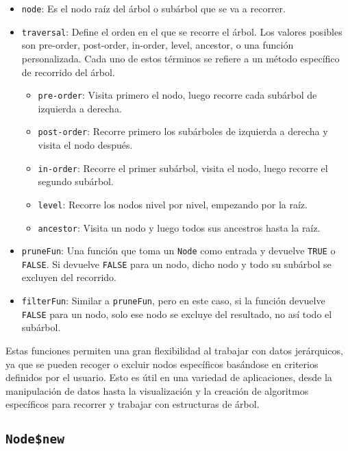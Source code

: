 \documentclass[12pt]{report}\usepackage[]{graphicx}\usepackage[dvipsnames]{xcolor}
\begin{document}
			 	\begin{itemize}
			 		\item \texttt{node}: Es el nodo raíz del árbol o subárbol que se va a recorrer.
			 		\item \texttt{traversal}: Define el orden en el que se recorre el árbol. Los valores posibles son pre-order, post-order, in-order, level, ancestor, o una función personalizada. Cada uno de estos términos se refiere a un método específico de recorrido del árbol.
			 		
			 		\begin{itemize}
			 			\item \texttt{pre-order}: Visita primero el nodo, luego recorre cada subárbol de izquierda a derecha.
			 			\item \texttt{post-order}: Recorre primero los subárboles de izquierda a derecha y visita el nodo después.
			 			\item \texttt{in-order}: Recorre el primer subárbol, visita el nodo, luego recorre el segundo subárbol.
			 			\item \texttt{level}: Recorre los nodos nivel por nivel, empezando por la raíz.
			 			\item \texttt{ancestor}: Visita un nodo y luego todos sus ancestros hasta la raíz.
			 		\end{itemize}
			 		
			 		\item \texttt{pruneFun}: Una función que toma un \texttt{Node} como entrada y devuelve \texttt{TRUE} o \texttt{FALSE}. Si devuelve \texttt{FALSE} para un nodo, dicho nodo y todo su subárbol se excluyen del recorrido.
			 		\item \texttt{filterFun}: Similar a \texttt{pruneFun}, pero en este caso, si la función devuelve \texttt{FALSE} para un nodo, solo ese nodo se excluye del resultado, no así todo el subárbol.
			 	\end{itemize}
			 	
			 	Estas funciones permiten una gran flexibilidad al trabajar con datos jerárquicos, ya que se pueden recoger o excluir nodos específicos basándose en criterios definidos por el usuario. Esto es útil en una variedad de aplicaciones, desde la manipulación de datos hasta la visualización y la creación de algoritmos específicos para recorrer y trabajar con estructuras de árbol.
 	
			\subsection{\texttt{Node\$new}}
 	
\end{document}
